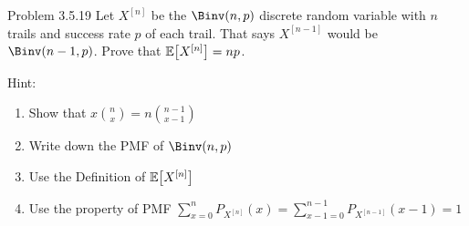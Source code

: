 \begin{problem}{Problem 3.5.19}
    Let $X^{[n]}$ be the $\Binv(n, p)$ discrete random variable with $n$ trails and success rate $p$ of each trail. That says $X^{[n-1]}$ would be $\Binv(n-1, p)$. Prove that $\E{X^{[n]}}=np$.

    Hint:{
        \begin{enumerate}
            \item Show that $x\binom{n}{x}=n\binom{n-1}{x-1}$
            \item Write down the PMF of $\Binv(n, p)$
            \item Use the Definition of $\E{X^{[n]}}$
            \item Use the property of PMF $\sum_{x=0}^{n}P_{X^{[n]}}(x)=\sum_{x-1=0}^{n-1}P_{X^{[n-1]}}(x-1)=1$
        \end{enumerate}
    }
\end{problem}